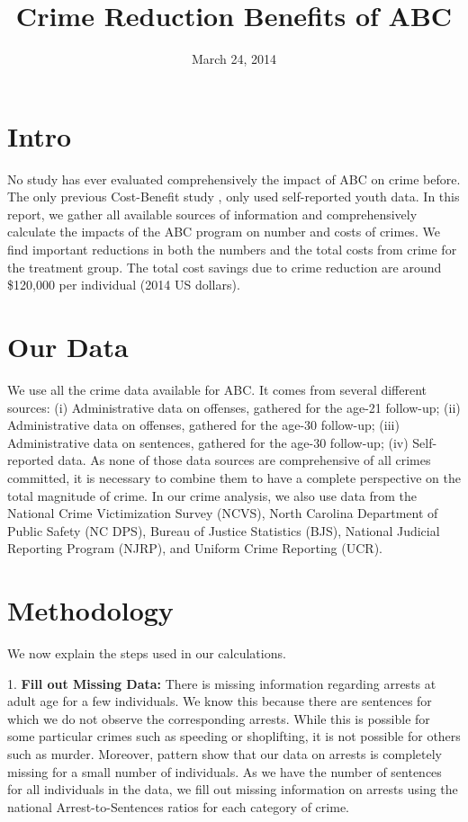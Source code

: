 \documentclass[11pt]{amsart}
\title{Crime Reduction Benefits of ABC}
\date{March 24, 2014}
\begin{document}
\maketitle

%
\section{Intro}
No study has ever evaluated comprehensively the impact of ABC on crime before. The only previous Cost-Benefit study \citep{barnett2007comparative}, only used self-reported youth data. In this report, we gather all available sources of information and comprehensively calculate the impacts of the ABC program on number and costs of crimes. We find important reductions in both the numbers and the total costs from crime for the treatment group. The total cost savings due to crime reduction are around \$120,000 per individual (2014 US dollars). 

\section{Our Data}
We use all the crime data available for ABC. It comes from several different sources: (i) Administrative data on offenses, gathered for the age-21 follow-up; (ii) Administrative data on offenses, gathered for the age-30 follow-up; (iii) Administrative data on sentences, gathered for the age-30 follow-up; (iv) Self-reported data. As none of those data sources are comprehensive of all crimes committed, it is necessary to combine them to have a complete perspective on the total magnitude of crime. In our crime analysis, we also use data from the National Crime Victimization Survey (NCVS), North Carolina Department of Public Safety (NC DPS), Bureau of Justice Statistics (BJS), National Judicial Reporting Program (NJRP), and Uniform Crime Reporting (UCR). 

\section{Methodology}
We now explain the steps used in our calculations.

1. \textbf{Fill out Missing Data:} There is missing information regarding arrests at adult age for a few individuals. We know this because there are sentences for which we do not observe the corresponding arrests. While this is possible for some particular crimes such as speeding or shoplifting, it is not possible for others such as murder. Moreover, pattern show that our data on arrests is completely missing for a small number of individuals. As we have the number of sentences for all individuals in the data, we fill out missing information on arrests using the national Arrest-to-Sentences ratios for each category of crime. \\
\end{document}
